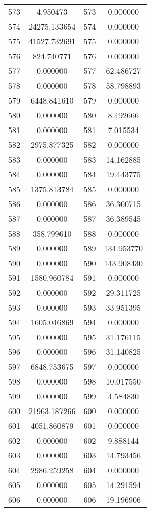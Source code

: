 \documentclass[12pt]{article}
\begin{document}
\begin{longtable}{@{}cccc@{}}
573 & 4.950473 & 573 & 0.000000 \\
574 & 24275.133654 & 574 & 0.000000 \\
575 & 41527.732691 & 575 & 0.000000 \\
576 & 824.740771 & 576 & 0.000000 \\
577 & 0.000000 & 577 & 62.486727 \\
578 & 0.000000 & 578 & 58.798893 \\
579 & 6448.841610 & 579 & 0.000000 \\
580 & 0.000000 & 580 & 8.492666 \\
581 & 0.000000 & 581 & 7.015534 \\
582 & 2975.877325 & 582 & 0.000000 \\
583 & 0.000000 & 583 & 14.162885 \\
584 & 0.000000 & 584 & 19.443775 \\
585 & 1375.813784 & 585 & 0.000000 \\
586 & 0.000000 & 586 & 36.300715 \\
587 & 0.000000 & 587 & 36.389545 \\
588 & 358.799610 & 588 & 0.000000 \\
589 & 0.000000 & 589 & 134.953770 \\
590 & 0.000000 & 590 & 143.908430 \\
591 & 1580.960784 & 591 & 0.000000 \\
592 & 0.000000 & 592 & 29.311725 \\
593 & 0.000000 & 593 & 33.951395 \\
594 & 1605.046869 & 594 & 0.000000 \\
595 & 0.000000 & 595 & 31.176115 \\
596 & 0.000000 & 596 & 31.140825 \\
597 & 6848.753675 & 597 & 0.000000 \\
598 & 0.000000 & 598 & 10.017550 \\
599 & 0.000000 & 599 & 4.584830 \\
600 & 21963.187266 & 600 & 0.000000 \\
601 & 4051.860879 & 601 & 0.000000 \\
602 & 0.000000 & 602 & 9.888144 \\
603 & 0.000000 & 603 & 14.793456 \\
604 & 2986.259258 & 604 & 0.000000 \\
605 & 0.000000 & 605 & 14.291594 \\
606 & 0.000000 & 606 & 19.196906 \\

\end{longtable}
\end{document}
